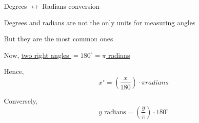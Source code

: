 \documentclass[14pt,fleqn]{extarticle}
\begin{document}
\begin{skill}
Degrees $\longleftrightarrow$ Radians conversion
\end{skill}

%

\newcard

Degrees and radians are not the
only units for measuring angles \newline 

But they are the most common ones \newline 

Now, \underline{two right angles $= 180^\circ = \pi$ radians}\newline 

Hence, 
\[\qquad  x^\circ = \left(\frac{x}{180}\right)\cdot\pi radians \]

Conversely, 
\[ \qquad y \text{ radians} = \left( \frac{y}\pi\right)\cdot 180^\circ\]
%
\end{document}
